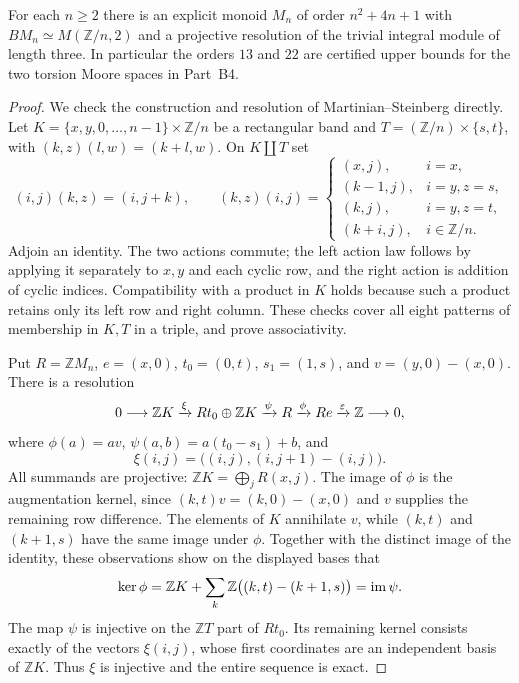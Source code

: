 \begin{proposition}\label{prop:B-Moore-models}
For each $n\ge2$ there is an explicit monoid $M_n$ of order
$n^2+4n+1$ with $BM_n\simeq M(\mathbb Z/n,2)$ and a projective
resolution of the trivial integral module of length three.
In particular the orders $13$ and $22$ are certified upper bounds
for the two torsion Moore spaces in Part~B4.
\end{proposition}
\begin{proof}
We check the construction and resolution of Martinian--Steinberg
\cite[Theorem~4.1]{MartinianSteinberg2025B} directly.
Let $K=\{x,y,0,\ldots,n-1\}\times\mathbb Z/n$ be a rectangular
band and $T=(\mathbb Z/n)\times\{s,t\}$, with
$(k,z)(l,w)=(k+l,w)$.  On $K\amalg T$ set
\[
 (i,j)(k,z)=(i,j+k),\qquad
 (k,z)(i,j)=\begin{cases}
 (x,j),&i=x,\\
 (k-1,j),&i=y, z=s,\\
 (k,j),&i=y, z=t,\\
 (k+i,j),&i\in\mathbb Z/n.
 \end{cases}
\]
Adjoin an identity.  The two actions commute; the left action law
follows by applying it separately to $x,y$ and each cyclic row,
and the right action is addition of cyclic indices.  Compatibility
with a product in $K$ holds because such a product retains only its
left row and right column.  These checks cover all eight patterns of
membership in $K,T$ in a triple, and prove associativity.

Put $R=\mathbb ZM_n$, $e=(x,0)$, $t_0=(0,t)$,
$s_1=(1,s)$, and $v=(y,0)-(x,0)$.  There is a resolution
\[
 0\longrightarrow\mathbb ZK\xrightarrow{\xi}
 Rt_0\oplus\mathbb ZK\xrightarrow{\psi}R
 \xrightarrow{\phi}Re\xrightarrow{\varepsilon}\mathbb Z\longrightarrow0,
\]
where $\phi(a)=av$,
$\psi(a,b)=a(t_0-s_1)+b$, and
\[
 \xi(i,j)=\big((i,j),(i,j+1)-(i,j)\big).
\]
All summands are projective: $\mathbb ZK=\bigoplus_jR(x,j)$.
The image of $\phi$ is the augmentation kernel, since
$(k,t)v=(k,0)-(x,0)$ and $v$ supplies the remaining row difference.
The elements of $K$ annihilate $v$, while
$(k,t)$ and $(k+1,s)$ have the same image under $\phi$.
Together with the distinct image of the identity, these observations
show on the displayed bases that
\[
 \ker\phi=\mathbb ZK+
 \sum_k\mathbb Z\big((k,t)-(k+1,s)\big)=\operatorname{im}\psi.
\]
The map $\psi$ is injective on the $\mathbb ZT$ part of $Rt_0$.
Its remaining kernel consists exactly of the vectors $\xi(i,j)$,
whose first coordinates are an independent basis of $\mathbb ZK$.
Thus $\xi$ is injective and the entire sequence is exact.


\end{proof}
